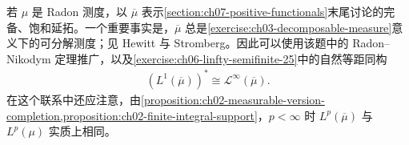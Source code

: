 \documentclass[../../main.tex]{subfiles}
\begin{document}
若 $\mu$ 是 Radon 测度，以 $\overline\mu$ 表示\cref{section:ch07-positive-functionals}末尾讨论的完备、饱和延拓。一个重要事实是，$\overline\mu$ 总是\cref{exercise:ch03-decomposable-measure}意义下的可分解测度；见 Hewitt 与 Stromberg\cite[定理 19.30]{folland-bib-076}。因此可以使用该题中的 Radon--Nikodym 定理推广，以及\cref{exercise:ch06-linfty-semifinite-25}中的自然等距同构
\begin{align*}
(L^1(\overline\mu))^*\cong\mathcal L^\infty(\overline\mu).
\end{align*}
在这个联系中还应注意，由\cref{proposition:ch02-measurable-version-completion,proposition:ch02-finite-integral-support}，$p<\infty$ 时 $L^p(\overline\mu)$ 与 $L^p(\mu)$ 实质上相同。
\end{document}
